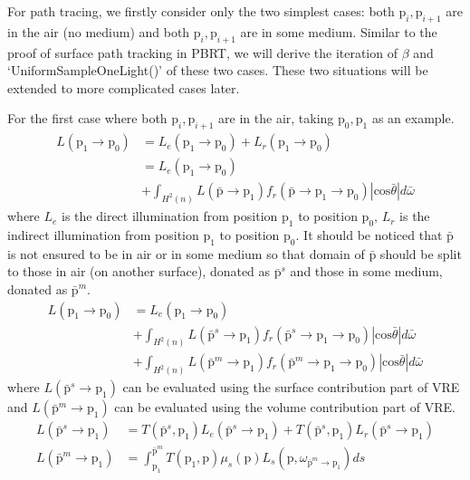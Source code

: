 \documentclass[acmtog]{acmart}
\def\w{\omega}
\def\p{\mathrm{p}}
\def\pp#1#2{\p_{#1}\rightarrow\p_{#2}}
\begin{document}
    For path tracing, we firstly consider only the two simplest cases: 
    both $\p_i,\p_{i+1}$ are in the air (no medium) and both $\p_i,\p_{i+1}$ are in some medium.
    Similar to the proof of surface path tracking in PBRT, we will derive the iteration of $\beta$ and `UniformSampleOneLight()' of these two cases.
    These two situations will be extended to more complicated cases later.\par
        For the first case where both $\p_i,\p_{i+1}$ are in the air, taking $\p_0,\p_1$ as an example.
\begin{equation} \label{eq4}
\begin{split}
    L(\pp{1}{0}) &= L_e(\pp{1}{0}) + L_r(\pp{1}{0})\\
                 &= L_e(\pp{1}{0})\\
                 &+ \int_{H^2(n)}L(\bar{\p}\rightarrow\p_1)f_r(\bar{\p}\rightarrow\p_1\rightarrow\p_0)|\mathrm{cos}\bar{\theta}|d\bar{\w}
\end{split}
\end{equation}
    where $L_e$ is the direct illumination from position $\p_1$ to position $\p_0$, 
    $L_r$ is the indirect illumination from position $\p_1$ to position $\p_0$.
    It should be noticed that $\bar{\p}$ is not ensured to be in air or in some medium so that 
    domain of $\bar{\p}$ should be split to those in air (on another surface), donated as $\bar{\p}^s$ and those in some medium, donated as $\bar{\p}^m$.
\begin{equation} \label{eq5}
\begin{split}
    L(\pp{1}{0}) &= L_e(\pp{1}{0})\\
                 &+ \int_{H^2(n)}L(\bar{\p}^s\rightarrow\p_1)f_r(\bar{\p}^s\rightarrow\p_1\rightarrow\p_0)|\mathrm{cos}\bar{\theta}|d\bar{\w}\\
                 &+ \int_{H^2(n)}L(\bar{\p}^m\rightarrow\p_1)f_r(\bar{\p}^m\rightarrow\p_1\rightarrow\p_0)|\mathrm{cos}\bar{\theta}|d\bar{\w}
\end{split}
\end{equation}
    where $L(\bar{\p}^s\rightarrow\p_1)$ can be evaluated using the surface contribution part of VRE and 
    $L(\bar{\p}^m\rightarrow\p_1)$ can be evaluated using the volume contribution part of VRE.
\begin{equation} \label{eq6}
\begin{split}
    L(\bar{\p}^s\rightarrow\p_1) &= T(\bar{\p}^s,\p_1)L_e(\bar{\p}^s\rightarrow\p_1)+T(\bar{\p}^s,\p_1)L_r(\bar{\p}^s\rightarrow\p_1)\\
    L(\bar{\p}^m\rightarrow\p_1) &= \int_{\p_1}^{\bar{\p}^m}T(\p_1,\p)\mu_s(\p)L_s(\p,\w_{\bar{\p}^m\rightarrow\p_1})ds
\end{split}
\end{equation}
\end{document}
